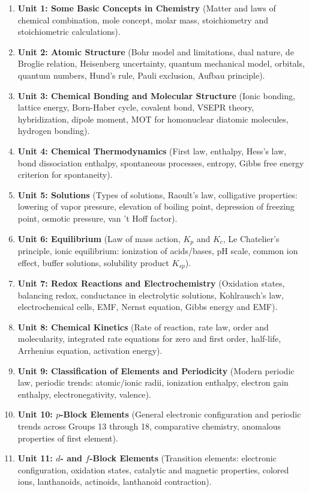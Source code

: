 \documentclass[10pt,twoside,openright]{book}
\begin{document}
\begin{enumerate}[leftmargin=*]
  \item \textbf{Unit 1: Some Basic Concepts in Chemistry} (Matter and laws of chemical combination, mole concept, molar mass, stoichiometry and stoichiometric calculations).
  \item \textbf{Unit 2: Atomic Structure} (Bohr model and limitations, dual nature, de Broglie relation, Heisenberg uncertainty, quantum mechanical model, orbitals, quantum numbers, Hund's rule, Pauli exclusion, Aufbau principle).
  \item \textbf{Unit 3: Chemical Bonding and Molecular Structure} (Ionic bonding, lattice energy, Born-Haber cycle, covalent bond, VSEPR theory, hybridization, dipole moment, MOT for homonuclear diatomic molecules, hydrogen bonding).
  \item \textbf{Unit 4: Chemical Thermodynamics} (First law, enthalpy, Hess's law, bond dissociation enthalpy, spontaneous processes, entropy, Gibbs free energy criterion for spontaneity).
  \item \textbf{Unit 5: Solutions} (Types of solutions, Raoult's law, colligative properties: lowering of vapor pressure, elevation of boiling point, depression of freezing point, osmotic pressure, van 't Hoff factor).
  \item \textbf{Unit 6: Equilibrium} (Law of mass action, $K_p$ and $K_c$, Le Chatelier's principle, ionic equilibrium: ionization of acids/bases, pH scale, common ion effect, buffer solutions, solubility product $K_{sp}$).
  \item \textbf{Unit 7: Redox Reactions and Electrochemistry} (Oxidation states, balancing redox, conductance in electrolytic solutions, Kohlrausch's law, electrochemical cells, EMF, Nernst equation, Gibbs energy and EMF).
  \item \textbf{Unit 8: Chemical Kinetics} (Rate of reaction, rate law, order and molecularity, integrated rate equations for zero and first order, half-life, Arrhenius equation, activation energy).
  \item \textbf{Unit 9: Classification of Elements and Periodicity} (Modern periodic law, periodic trends: atomic/ionic radii, ionization enthalpy, electron gain enthalpy, electronegativity, valence).
  \item \textbf{Unit 10: $p$-Block Elements} (General electronic configuration and periodic trends across Groups 13 through 18, comparative chemistry, anomalous properties of first element).
  \item \textbf{Unit 11: $d$- and $f$-Block Elements} (Transition elements: electronic configuration, oxidation states, catalytic and magnetic properties, colored ions, lanthanoids, actinoids, lanthanoid contraction).

\end{enumerate}
\end{document}

